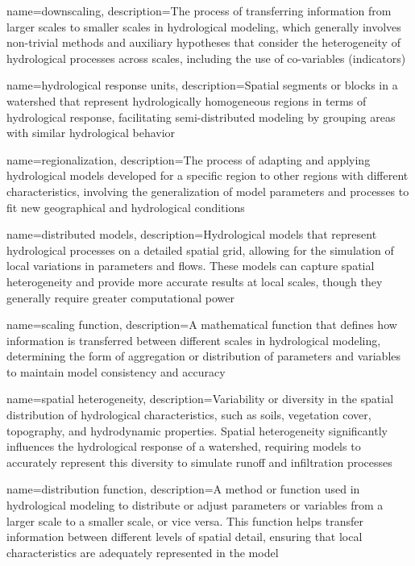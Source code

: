 {
    name=downscaling,
    description={The process of transferring information from larger scales to smaller scales in hydrological modeling, which generally involves non-trivial methods and auxiliary hypotheses that consider the heterogeneity of hydrological processes across scales, including the use of co-variables (indicators)}
}

{
    name=hydrological response units,
    description={Spatial segments or blocks in a watershed that represent hydrologically homogeneous regions in terms of hydrological response, facilitating semi-distributed modeling by grouping areas with similar hydrological behavior}
}

{
    name=regionalization,
    description={The process of adapting and applying hydrological models developed for a specific region to other regions with different characteristics, involving the generalization of model parameters and processes to fit new geographical and hydrological conditions}
}

{
    name=distributed models,
    description={Hydrological models that represent hydrological processes on a detailed spatial grid, allowing for the simulation of local variations in parameters and flows. These models can capture spatial heterogeneity and provide more accurate results at local scales, though they generally require greater computational power}
}

{
    name=scaling function,
    description={A mathematical function that defines how information is transferred between different scales in hydrological modeling, determining the form of aggregation or distribution of parameters and variables to maintain model consistency and accuracy}
}

{
    name=spatial heterogeneity,
    description={Variability or diversity in the spatial distribution of hydrological characteristics, such as soils, vegetation cover, topography, and hydrodynamic properties. Spatial heterogeneity significantly influences the hydrological response of a watershed, requiring models to accurately represent this diversity to simulate runoff and infiltration processes}
}

{
    name=distribution function,
    description={A method or function used in hydrological modeling to distribute or adjust parameters or variables from a larger scale to a smaller scale, or vice versa. This function helps transfer information between different levels of spatial detail, ensuring that local characteristics are adequately represented in the model}
}

